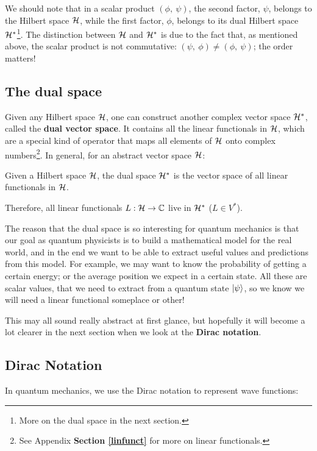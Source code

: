 We should note that in a scalar product $(\phi, \ \psi)$, the second factor, $\psi$, belongs to the Hilbert space $\mathcal{H}$, while the first factor, $\phi$, belongs to its dual Hilbert space $\mathcal{H}^*$\footnote{More on the dual space in the next section.}. The distinction between $\mathcal{H}$ and $\mathcal{H}^*$ is due to the fact that, as mentioned above, the scalar product is not commutative: $(\psi, \ \phi) \neq (\phi, \ \psi)$; the order matters!

\subsection{The dual space} \label{dualspace}

Given any Hilbert space $\mathcal{H}$, one can construct another complex vector space $\mathcal{H}^*$, called the \textbf{dual vector space}. It contains all the linear functionals in $\mathcal{H}$, which are a special kind of operator that maps all elements of $\mathcal{H}$ onto complex numbers\footnote{See Appendix \textbf{Section \ref{linfunct}} for more on linear functionals.}. In general, for an abstract vector space $\mathcal{H}$:

\begin{definition}
    Given a Hilbert space $\mathcal{H}$, the dual space $\mathcal{H}^*$ is the vector space of all linear functionals in $\mathcal{H}$.
\end{definition}

Therefore, all linear functionals $L: \mathcal{H}\to \mathbb{C}$ live in $\mathcal{H}^*$ ($L\in V^*$).

The reason that the dual space is so interesting for quantum mechanics is that our goal as quantum physicists is to build a mathematical model for the real world, and in the end we want to be able to extract useful values and predictions from this model. For example, we may want to know the probability of getting a certain energy; or the average position we expect in a certain state. All these are scalar values, that we need to extract from a quantum state $\ket{\psi}$, so we know we will need a linear functional someplace or other!

This may all sound really abstract at first glance, but hopefully it will become a lot clearer in the next section when we look at the \textbf{Dirac notation}.

\subsection{Dirac Notation}

In quantum mechanics, we use the Dirac notation to represent wave functions:

